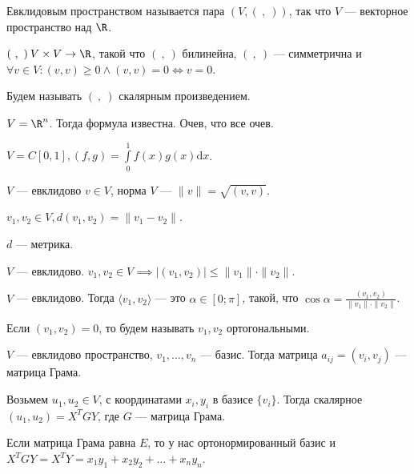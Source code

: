 \begin{definition}
    Евклидовым пространством называется пара $(V, (\ ,\ ))$, так что $V$ --- векторное пространство над  $\R$.

    $(\ ,\ )\: V \times V \to \R$, такой что  $(\ ,\ )$ билинейна,  $(\ ,\ )$ --- симметрична и  $\forall v \in V\!: (v, v) \ge 0 \land (v, v) = 0 \iff v = 0$.

    Будем называть $(\ ,\ )$ скалярным произведением.
\end{definition}
\begin{example}
    $V=\R^n$. Тогда формула известна. Очев, что все очев.
\end{example}
\begin{example}
    $V = C[0, 1], (f, g) = \int\limits_0^{1}f(x)g(x) \mathrm{d}x$.
\end{example}
\begin{definition}
    $V$ --- евклидово  $v \in V$, норма  $V$ --- $\|v\| = \sqrt{(v, v)}$.

     $v_1, v_2 \in V, d(v_1, v_2) = \|v_1 - v_2\|$.
\end{definition}
\begin{statement}
    $d$ --- метрика.
\end{statement}
\begin{statement}
    $V$ --- евклидово. $v_1, v_2 \in V \implies |(v_1,v_2)| \le \|v_1\| \cdot \|v_2\|$.
\end{statement}
\begin{definition}
    $V$ --- евклидово. Тогда  $\langle v_1, v_2 \rangle$ --- это $\alpha \in [0; \pi]$,  такой, что  $\cos \alpha = \frac{(v_1, v_2)}{\|v_1\| \cdot \|v_2\|}$. 
\end{definition}
\begin{definition}
    Если $(v_1, v_2) = 0$, то будем называть $v_1, v_2$ ортогональными.
\end{definition}
\begin{definition}
    $V$ --- евклидово пространство,  $v_1, \ldots, v_n$ --- базис. Тогда матрица $a_{ij} = (v_i, v_j)$ --- матрица Грама.
\end{definition}

Возьмем $u_1, u_2 \in V$, с координатами $x_i, y_i$ в базисе  $\{v_i\}$. Тогда скалярное  $(u_1, u_2) = X^TGY$, где $G$ --- матрица Грама.

Если матрица Грама равна  $E$, то у нас ортонормированный базис и $X^TGY = X^TY=x_1y_1 + x_2y_2 + \ldots + x_ny_n$.

